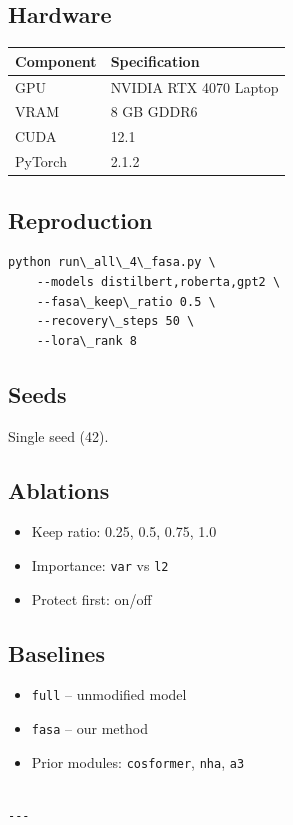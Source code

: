 \subsection{Hardware}

\begin{table}[H]
\centering
\small
\begin{tabular}{ll}
\toprule
\textbf{Component} & \textbf{Specification} \\
\midrule
GPU & NVIDIA RTX 4070 Laptop \\
VRAM & 8 GB GDDR6 \\
CUDA & 12.1 \\
PyTorch & 2.1.2 \\
\bottomrule
\end{tabular}
\end{table}

\subsection{Reproduction}

\begin{lstlisting}
python run\_all\_4\_fasa.py \
    --models distilbert,roberta,gpt2 \
    --fasa\_keep\_ratio 0.5 \
    --recovery\_steps 50 \
    --lora\_rank 8
\end{lstlisting}

\subsection{Seeds}

Single seed (42).

\subsection{Ablations}

\begin{itemize}
\item Keep ratio: 0.25, 0.5, 0.75, 1.0
\item Importance: \texttt{var} vs \texttt{l2}
\item Protect first: on/off

\end{itemize}
\subsection{Baselines}

\begin{itemize}
\item \texttt{full} -- unmodified model
\item \texttt{fasa} -- our method
\item Prior modules: \texttt{cosformer}, \texttt{nha}, \texttt{a3}
\end{itemize}
\begin{lstlisting}

---
\end{lstlisting}